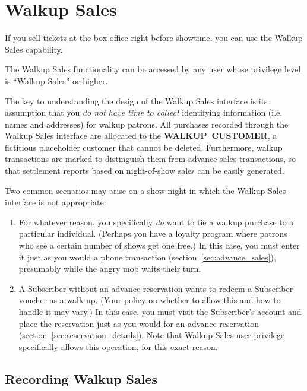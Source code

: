 \section{Walkup Sales}
\label{sec:walkup}

If you sell tickets at the box office right before showtime, you can use
the Walkup Sales capability.

The Walkup Sales functionality can be accessed by any user whose
privilege level is ``Walkup Sales'' or higher.

The key to understanding the design of the Walkup Sales interface is its
assumption that you \emph{do not have time to collect} identifying
information (i.e. names and addresses) for walkup patrons.  All
purchases recorded through the Walkup Sales interface are allocated to
the \textbf{WALKUP~CUSTOMER}, a fictitious placeholder customer that
cannot be deleted.  Furthermore, walkup transactions are marked to
distinguish them from advance-sales transactions, so that settlement
reports based on night-of-show sales can be easily generated.

Two common scenarios may arise on a show night in which the Walkup Sales
interface is not appropriate:

\begin{enumerate}
\item For whatever reason, you specifically \emph{do} want to tie a
  walkup purchase to a particular individual.  (Perhaps you have a
  loyalty program where patrons who see a certain number of shows get
  one free.)  In this case, you must
  enter it just as you would a phone transaction
  (section~\ref{sec:advance_sales}), presumably while the angry mob
  waits their turn.
\item A Subscriber without an advance reservation wants to redeem a
  Subscriber voucher as a walk-up.  (Your policy on whether to allow
  this and how to handle it may vary.)  In this case, you must visit the
  Subscriber's account and place the reservation just as you would for
  an advance reservation (section~\ref{sec:reservation_details}).  Note
  that Walkup Sales user privilege specifically allows this operation,
  for this exact reason.
  
\end{enumerate}

\subsection{Recording Walkup Sales}
\label{sec:walkup_sales}


